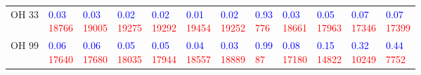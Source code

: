 \begin{tabular}{llllllllllll}
OH 33  &  \makecell{\textcolor{blue}{0.03} \\ \textcolor{red}{18766}} &  \makecell{\textcolor{blue}{0.03} \\ \textcolor{red}{19005}} &  \makecell{\textcolor{blue}{0.02} \\ \textcolor{red}{19275}} &  \makecell{\textcolor{blue}{0.02} \\ \textcolor{red}{19292}} &  \makecell{\textcolor{blue}{0.01} \\ \textcolor{red}{19454}} &  \makecell{\textcolor{blue}{0.02} \\ \textcolor{red}{19252}} &   \makecell{\textcolor{blue}{0.93} \\ \textcolor{red}{776}} &  \makecell{\textcolor{blue}{0.03} \\ \textcolor{red}{18661}} &  \makecell{\textcolor{blue}{0.05} \\ \textcolor{red}{17963}} &  \makecell{\textcolor{blue}{0.07} \\ \textcolor{red}{17346}} &  \makecell{\textcolor{blue}{0.07} \\ \textcolor{red}{17399}} \\
OH 99  &  \makecell{\textcolor{blue}{0.06} \\ \textcolor{red}{17640}} &  \makecell{\textcolor{blue}{0.06} \\ \textcolor{red}{17680}} &  \makecell{\textcolor{blue}{0.05} \\ \textcolor{red}{18035}} &  \makecell{\textcolor{blue}{0.05} \\ \textcolor{red}{17944}} &  \makecell{\textcolor{blue}{0.04} \\ \textcolor{red}{18557}} &  \makecell{\textcolor{blue}{0.03} \\ \textcolor{red}{18889}} &    \makecell{\textcolor{blue}{0.99} \\ \textcolor{red}{87}} &  \makecell{\textcolor{blue}{0.08} \\ \textcolor{red}{17180}} &  \makecell{\textcolor{blue}{0.15} \\ \textcolor{red}{14822}} &  \makecell{\textcolor{blue}{0.32} \\ \textcolor{red}{10249}} &   \makecell{\textcolor{blue}{0.44} \\ \textcolor{red}{7752}} \\

\end{tabular}
